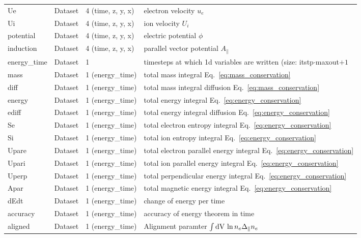 \begin{longtable}{lll>{\RaggedRight}p{7cm}}
Ue               & Dataset & 4 (time, z, y, x) & electron velocity $u_e$ \\
Ui               & Dataset & 4 (time, z, y, x) & ion velocity $U_i$ \\
potential        & Dataset & 4 (time, z, y, x) & electric potential $\phi$ \\
induction        & Dataset & 4 (time, z, y, x) & parallel vector potential $A_\parallel$ \\
energy\_time     & Dataset & 1 & timesteps at which 1d variables are written (size: itstp$\cdot$maxout$+1$ \\
mass      & Dataset & 1 (energy\_time) & total mass integral Eq.~\eqref{eq:mass_conservation} \\
diff      & Dataset & 1 (energy\_time) & total mass integral diffusion Eq.~\eqref{eq:mass_conservation} \\
energy    & Dataset & 1 (energy\_time) & total energy integral Eq.~\eqref{eq:energy_conservation} \\
ediff     & Dataset & 1 (energy\_time) & total energy integral diffusion Eq.~\eqref{eq:energy_conservation} \\
Se        & Dataset & 1 (energy\_time) & total electron entropy integral Eq.~\eqref{eq:energy_conservation} \\
Si        & Dataset & 1 (energy\_time) & total ion entropy integral Eq.~\eqref{eq:energy_conservation} \\
Upare        & Dataset & 1 (energy\_time) & total electron parallel energy integral Eq.~\eqref{eq:energy_conservation} \\
Upari        & Dataset & 1 (energy\_time) & total ion parallel energy integral Eq.~\eqref{eq:energy_conservation} \\
Uperp     & Dataset & 1 (energy\_time) & total perpendicular energy integral Eq.~\eqref{eq:energy_conservation} \\
Apar     & Dataset & 1 (energy\_time) & total magnetic energy integral Eq.~\eqref{eq:energy_conservation} \\
dEdt      & Dataset & 1 (energy\_time) & change of energy per time  \\
accuracy  & Dataset & 1 (energy\_time) & accuracy of energy theorem in time  \\
aligned   & Dataset & 1 (energy\_time) & Alignment paramter $\int\mathrm{dV}\, \ln n_e\Delta_\parallel n_e$\\
\bottomrule
\end{longtable}






